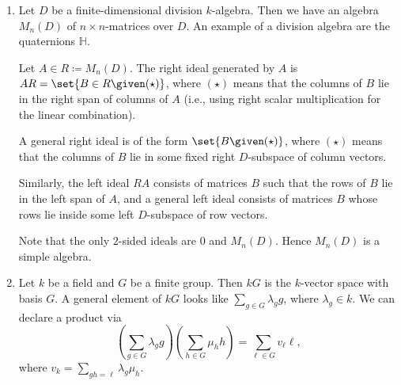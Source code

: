 \begin{enumerate}
	\item Let $D$ be a finite-dimensional division $k$-algebra. Then we have an
		algebra $M_n(D)$ of $n\times n$-matrices over $D$. An example of a division
		algebra are the quaternions $\mathbb{H}$.

		Let $A \in R\coloneqq  M_n(D)$. The right ideal generated by $A$ is
		$A R = \set{B \in R\given (\star)}$, where $(\star)$ means that the
		columns of $B$ lie in the right span of columns of $A$ (i.e., using right
		scalar multiplication for the linear combination).

		A general right ideal is of the form $\set{B\given (\star)}$, where $(\star)$
		means that the columns of $B$ lie in some fixed right $D$-subspace of
		column vectors.

		Similarly, the left ideal $RA$ consists of matrices $B$ such that
		the rows of  $B$ lie in the left span of $A$, and a general left ideal
		consists of matrices $B$ whose rows lie inside some left $D$-subspace
		of row vectors.

		Note that the only $2$-sided ideals are $0$ and $M_n(D)$. Hence
		$M_n(D)$ is a simple algebra.

	\item Let $k$ be a field and $G$ be a finite group. Then $kG$ is the $k$-vector
		space with basis $G$. A general element of $kG$ looks like
		$\sum_{g \in G} \lambda_g g$, where $\lambda_g \in k$. We can declare
		a product via
		\[ \left(\sum_{g \in G}\lambda_g g\right)\left(\sum_{h \in G}\mu_h h\right) = \sum_{\ell \in G}v_\ell \ell, \]
		where $v_k = \sum_{gh = \ell} \lambda_g\mu_h$.
\end{enumerate}
